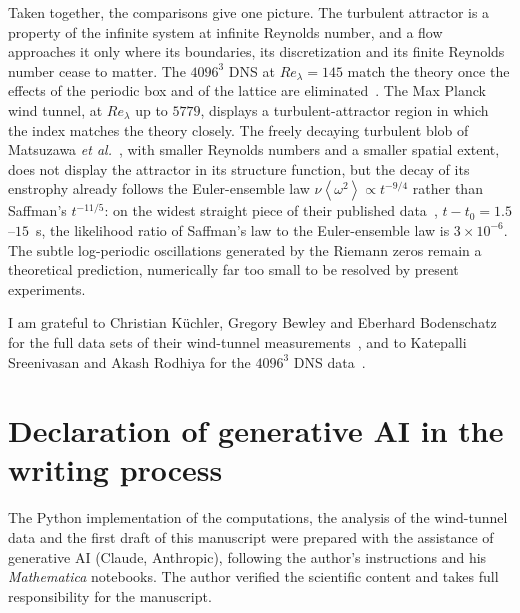 \documentclass[floatfix,aps,pre,preprint,superscriptaddress,nofootinbib,amsmath,amssymb]{revtex4-2}
\def\VEV#1{\left\langle #1 \right\rangle}
\def\Mathematica{\textit{Mathematica}}
\begin{document}
Taken together, the comparisons give one picture. The turbulent attractor is a property of the infinite system at infinite
Reynolds number, and a flow approaches it only where its boundaries, its discretization and its finite Reynolds number cease
to matter. The $4096^3$ DNS at $Re_\lambda=145$ match the theory once the effects of the periodic box and of the lattice are
eliminated~\cite{ReviewPaperAM,SreeniAkash2025}. The Max Planck wind tunnel, at $Re_\lambda$ up to $5779$, displays a
turbulent-attractor region in which the index matches the theory closely. The freely decaying turbulent blob of Matsuzawa
\emph{et al.}~\cite{Matsuzawa2026}, with smaller Reynolds numbers and a smaller spatial extent, does not display the
attractor in its structure function, but the decay of its enstrophy already follows the Euler-ensemble law
$\nu\VEV{\omega^2}\propto t^{-9/4}$ rather than Saffman's $t^{-11/5}$: on the widest straight piece of their published
data~\cite{MatsuzawaData2026}, $t-t_0=1.5$--$15$~s, the likelihood ratio of Saffman's law to the Euler-ensemble law is
$3\times10^{-6}$. The subtle log-periodic oscillations generated by the Riemann zeros remain a theoretical prediction,
numerically far too small to be resolved by present experiments.

\clearpage
\begin{acknowledgments}
I am grateful to Christian Küchler, Gregory Bewley and Eberhard Bodenschatz for the full data sets of their wind-tunnel
measurements~\cite{GregXi2}, and to Katepalli Sreenivasan and Akash Rodhiya for the $4096^3$ DNS data~\cite{SreeniAkash2025}.
\end{acknowledgments}

\section*{Declaration of generative AI in the writing process}
The Python implementation of the computations, the analysis of the wind-tunnel data and the first draft of this manuscript were
prepared with the assistance of generative AI (Claude, Anthropic), following the author's instructions and his \Mathematica{}
notebooks. The author verified the scientific content and takes full responsibility for the manuscript.
\end{document}
